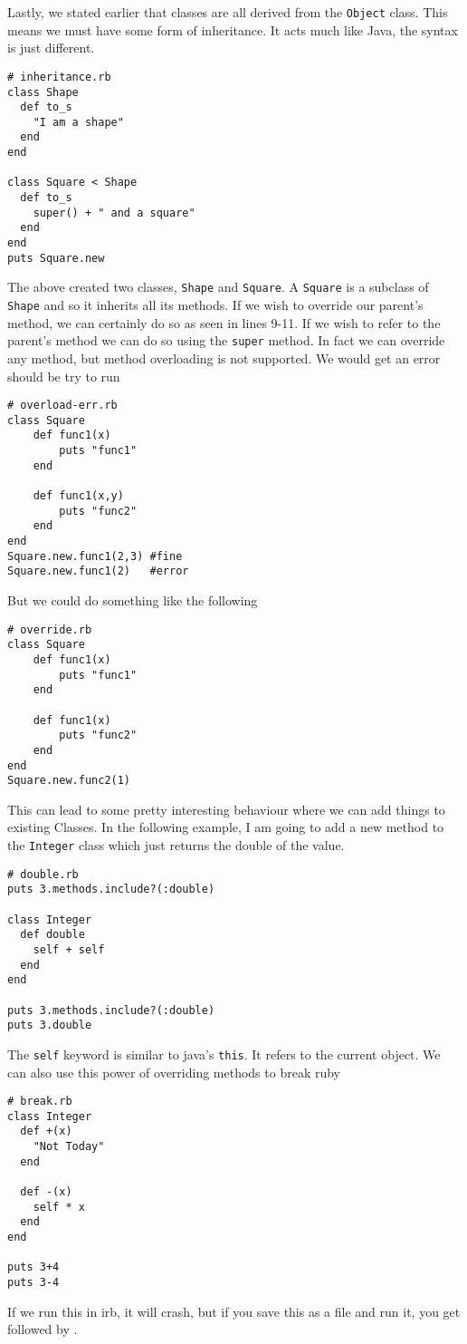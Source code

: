 \documentclass[main.tex]{subfiles}
\begin{document}
Lastly, we stated earlier that classes are all derived from the \texttt{Object} class. 
This means we must have some form of inheritance.
It acts much like Java, the syntax is just different.
\begin{lstlisting}[style=MyRubyStyle]
# inheritance.rb
class Shape
  def to_s
    "I am a shape" 
  end
end
 
class Square < Shape
  def to_s
    super() + " and a square"
  end
end
puts Square.new
\end{lstlisting}

The above created two classes, \texttt{Shape} and \texttt{Square}.
A \texttt{Square} is a subclass of \texttt{Shape} and so it inherits all its methods.
If we wish to override our parent's method, we can certainly do so as seen in lines 9-11.
If we wish to refer to the parent's method we can do so using the \texttt{super} method. 
In fact we can override any method, but method overloading is not supported. 
We would get an error should be try to run 
\begin{lstlisting}[style=MyRubyStyle]
# overload-err.rb
class Square
    def func1(x)
        puts "func1"
    end
    
    def func1(x,y)
        puts "func2"
    end
end
Square.new.func1(2,3) #fine
Square.new.func1(2)   #error
\end{lstlisting}
But we could do something like the following
\begin{lstlisting}[style=MyRubyStyle]
# override.rb
class Square
    def func1(x)
        puts "func1"
    end
    
    def func1(x)
        puts "func2"
    end
end
Square.new.func2(1)
\end{lstlisting}

This can lead to some pretty interesting behaviour where we can add things to existing Classes. In the following example, I am going to add a new method to the \texttt{Integer} class which just returns the double of the value.
\begin{lstlisting}[style=MyRubyStyle]
# double.rb
puts 3.methods.include?(:double)

class Integer
  def double
    self + self
  end
end

puts 3.methods.include?(:double)
puts 3.double
\end{lstlisting}

The \texttt{self} keyword is similar to java's \texttt{this}. It refers to the current object.
We can also use this power of overriding methods to break ruby
\begin{lstlisting}[style=MyRubyStyle]
# break.rb
class Integer
  def +(x)
    "Not Today"
  end

  def -(x)
    self * x
  end
end

puts 3+4
puts 3-4
\end{lstlisting}
If we run this in irb, it will crash, but if you save this as a file and run it, you get  followed by . 
\end{document}
